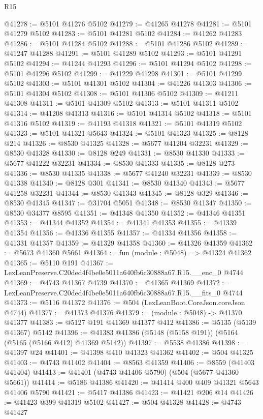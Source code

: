 \begin{lexlean}{R15}
\begin{coremodule}
{{{{{{{{{{{@41278 := @5101 @41276 @5102
@41279 := @41265 @41278
@41281 := @5101 @41279 @5102
@41283 := @5101 @41281 @5102
@41284 := @41262 @41283
@41286 := @5101 @41284 @5102
@41288 := @5101 @41286 @5102
@41289 := @41247 @41288
@41291 := @5101 @41289 @5102
@41293 := @5101 @41291 @5102
@41294 := @41244 @41293
@41296 := @5101 @41294 @5102
@41298 := @5101 @41296 @5102
@41299 := @41229 @41298
@41301 := @5101 @41299 @5102
@41303 := @5101 @41301 @5102
@41304 := @41226 @41303
@41306 := @5101 @41304 @5102
@41308 := @5101 @41306 @5102
@41309 := @41211 @41308
@41311 := @5101 @41309 @5102
@41313 := @5101 @41311 @5102
@41314 := @41208 @41313
@41316 := @5101 @41314 @5102
@41318 := @5101 @41316 @5102
@41319 := @41193 @41318
@41321 := @5101 @41319 @5102
@41323 := @5101 @41321 @5643
@41324 := @5101 @41323
@41325 := @8128 @214
@41326 := @8530 @41325
@41328 := @5677 @41204 @32231
@41329 := @8530 @41328
@41330 := @8128 @249
@41331 := @8530 @41330
@41333 := @5677 @41222 @32231
@41334 := @8530 @41333
@41335 := @8128 @273
@41336 := @8530 @41335
@41338 := @5677 @41240 @32231
@41339 := @8530 @41338
@41340 := @8128 @301
@41341 := @8530 @41340
@41343 := @5677 @41258 @32231
@41344 := @8530 @41343
@41345 := @8128 @329
@41346 := @8530 @41345
@41347 := @31704 @5051
@41348 := @8530 @41347
@41350 := @8530 @34377 @8595
@41351 := @41348 @41350
@41352 := @41346 @41351
@41353 := @41344 @41352
@41354 := @41341 @41353
@41355 := @41339 @41354
@41356 := @41336 @41355
@41357 := @41334 @41356
@41358 := @41331 @41357
@41359 := @41329 @41358
@41360 := @41326 @41359
@41362 := @5673 @41360 @5661
@41364 := fun (module : @5048) => @41324 @41362
@41365 := @5110 @191
@41367 := LexLeanPreserve.C20ded4f4be0e5011a640fb6c30888a67.R15.__enc_0 @4744
@41369 := @4743 @41367 @4739
@41370 := @41365 @41369
@41372 := LexLeanPreserve.C20ded4f4be0e5011a640fb6c30888a67.R15.__fits_0 @4744
@41373 := @5116 @41372
@41376 := @504 (LexLeanBoot.CoreJson.coreJson @4744)
@41377 := @41373 @41376
@41379 := (module : @5048) -> @41370 @41377
@41383 := @5127 @191 @41369 @41377 @412
@41386 := @5135 (@5139 @41367) @5142
@41396 := @41383 @41386 (@5148 (@5158 @191)) (@5164 (@5165 (@5166 @412) @41369 @5142))
@41397 := @5538 @41386
@41398 := @41397 @24
@41401 := @41398 @410 @41323 @41362
@41402 := @504 @41325
@41403 := @4743 @41402
@41404 := @8563 @41359
@41406 := @8559 (@41403 @41404)
@41413 := @41401 (@4743 @41406 @5790) (@504 (@5677 @41360 @5661))
@41414 := @5186 @41386
@41420 := @41414 @400 @409 @41321 @5643 @41406 @5790
@41421 := @5417 @41386
@41423 := @41421 @206 @14
@41426 := @41423 @399 @41319 @5102
@41427 := @504 @41328
@41428 := @4743 @41427
}}}}}}}}}}}
\end{coremodule}
\end{lexlean}
